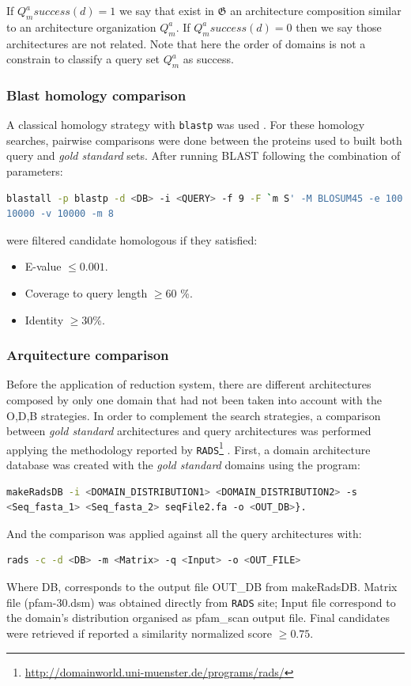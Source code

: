 \documentclass[11pt]{article}
\begin{document}
If $Q^a_{m}{success(d)} = 1$ we say that exist in $\boldsymbol{\mathfrak{G}}$ 
an architecture composition similar to an architecture organization $Q^{a}_{m}$. 
If $Q^a_{m}{success(d)} = 0$ then we say those architectures are not related. 
Note that here the order of domains  is not a constrain to classify a query set 
$Q^a_{m}$ as success.

\subsubsection*{\textbf{B}last homology comparison}
A classical homology strategy with \texttt{blastp} was used \cite{Korf:2003}. 
For these homology searches, pairwise comparisons were done between the 
proteins used to built both query and \textsl{gold standard} sets. After running 
BLAST following the combination of parameters: 
\begin{lstlisting}[language=bash, breaklines=true]
blastall -p blastp -d <DB> -i <QUERY> -f 9 -F `m S' -M BLOSUM45 -e 100 -b 
10000 -v 10000 -m 8
\end{lstlisting}

were filtered candidate homologous if they satisfied:
\begin{itemize}
\item E-value $\leq 0.001$.
\item Coverage to query length $\geq 60$ \%.
\item Identity $\geq 30$\%.
\end{itemize}

\subsubsection*{\textbf{A}rquitecture comparison}
Before the application of reduction system, there are different 
architectures composed by only one domain that had not been taken into account 
with the O,D,B strategies. In order to complement the search strategies, a
comparison between \textsl{gold standard} architectures and query architectures 
was performed applying the methodology reported 
by 
\texttt{RADS}\footnote{\url{http://domainworld.uni-muenster.de/programs/rads/} 
} \cite{Terrapon:2014}. First, a domain architecture database was created 
with the \textsl{gold standard} domains using the program: 
\begin{lstlisting}[language=bash, breaklines=true]
makeRadsDB -i <DOMAIN_DISTRIBUTION1> <DOMAIN_DISTRIBUTION2> -s 
<Seq_fasta_1> <Seq_fasta_2> seqFile2.fa -o <OUT_DB>}. 
\end{lstlisting} 
And the comparison was applied against all the query architectures with: 
\begin{lstlisting}[language=bash, breaklines=true]
rads -c -d <DB> -m <Matrix> -q <Input> -o <OUT_FILE>
\end{lstlisting}
Where DB, corresponds to the output file OUT\_DB from makeRadsDB. Matrix file 
(pfam-30.dsm) was obtained directly from \texttt{RADS} site; Input file 
correspond to the domain's distribution organised as pfam\_scan output 
file. Final candidates were retrieved if reported a similarity normalized score 
$\geq 0.75$.
\end{document}
